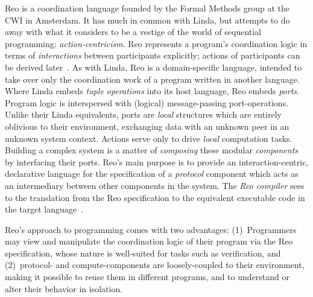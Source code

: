 Reo is a coordination language founded by the Formal Methods group at the CWI in Amsterdam. It has much in common with Linda, but attempts to do away with what it considers to be a vestige of the world of sequential programming: \textit{action-centricism}. Reo represents a program's coordination logic in terms of \textit{interactions} between participants explicitly; actions of participants can be derived later~\cite{arbab2011puff}. As with Linda, Reo is a domain-specific language, intended to take over only the coordination work of a program written in another language. Where Linda embeds \textit{tuple operations} into its host language, Reo embeds \textit{ports}. Program logic is interspersed with (logical) message-passing port-operations. Unlike their Linda equivalents, ports are \textit{local} structures which are entirely oblivious to their environment, exchanging data with an unknown peer in an unknown system context. Actions serve only to drive \textit{local} computation tasks. Building a complex system is a matter of \textit{composing} these modular \textit{components} by interfacing their ports. Reo's main purpose is to provide an interaction-centric, declarative language for the specification of a \textit{protocol} component which acts as an intermediary between other components in the system. The \textit{Reo compiler} sees to the translation from the Reo specification to the equivalent executable code in the target language~\cite{arbab2011puff}.

Reo's approach to programming comes with two advantages: (1)~Programmers may view and manipulate the coordination logic of their program via the Reo specification, whose nature is well-suited for tasks such as verification, and (2)~protocol- and compute-components are loosely-coupled to their environment, making it possible to reuse them in different programs, and to understand or alter their behavior in isolation.

%


